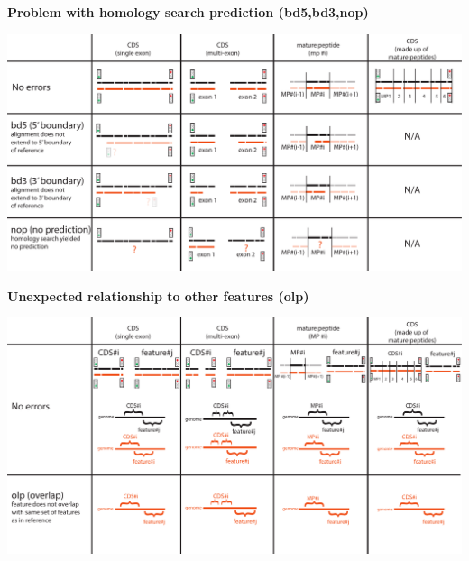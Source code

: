 \documentclass[landscape]{slides}
\begin{document}
\begin{slide}
\begin{center}
\textbf{Problem with homology search prediction (bd5,bd3,nop)}
\vspace{0.5in}

\includegraphics[width=10in]{figs/error-4-bd5-bd3-nop}
\end{center}
\vfill
\end{slide}
\begin{slide}
\begin{center}
\textbf{Unexpected relationship to other features (olp)}
\vspace{0.5in}

\includegraphics[width=10in]{figs/error-5-olp}
\end{center}
\vfill
\end{slide}
\end{document}
